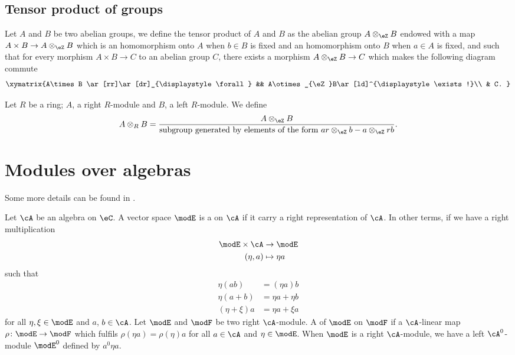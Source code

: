 					\subsection{Tensor product of groups}

Let $A$ and $B$ be two abelian groups, we define the tensor product of $A$ and $B$ as the abelian group $A\otimes_{\eZ}B$ endowed with a map $A\times B\to A\otimes_{\eZ}B$ which is an homomorphism onto $A$ when $b\in B$ is fixed and an homomorphism onto $B$ when $a\in A$ is fixed, and such that for every morphism $A\times B\to C$ to an abelian group $C$, there exists a morphism $A\otimes_{\eZ}B\to C$ which makes the following diagram commute
\[ 
\xymatrix{%
   A\times B \ar[rr]\ar[dr]_{\displaystyle\forall}		&&	A\otimes_{\eZ}B\ar[ld]^{\displaystyle\exists !}\\
								& C.
}
\]

Let $R$ be a ring; $A$, a right $R$-module and $B$, a left $R$-module. We define
\begin{equation}		\label{EqdefAtensRB}
	A\otimes_RB=\frac{ A\otimes_{\eZ}B }{\text{subgroup generated by elements of the form $ar\otimes_{\eZ}b-a\otimes_{\eZ}rb$}}.
\end{equation}

\section{Modules over algebras}

Some more details can be found in \cite{Landi}.


Let $\cA$ be an algebra on $\eC$. A vector space $\modE$ is a  on $\cA$ if it carry a right representation of $\cA$. In other terms, if we have a right multiplication 
\begin{equation}
\begin{aligned}
 \modE\times\cA&\to \modE \\ 
  (\eta,a)&\mapsto \eta a 
\end{aligned}
\end{equation}
such that
\begin{subequations}
\begin{align}
  \eta(ab)&=(\eta a)b\\
\eta(a+b)&=\eta a+\eta b\\
(\eta+\xi)a&=\eta a+\xi a
\end{align}
\end{subequations}
for all $\eta,\xi\in\modE$ and $a$, $b\in\cA$. Let $\modE$ and $\modF$ be two right $\cA$-module. A  of $\modE$ on $\modF$ if a $\cA$-linear map $\rho\colon \modE\to \modF$ which fulfils $\rho(\eta a)=\rho(\eta)a$ for all $a\in\cA$ and $\eta\in\modE$. When $\modE$ is a right $\cA$-module, we have a left $\cA^0$-module $\modE^0$ defined by $a^0\eta a$. 

